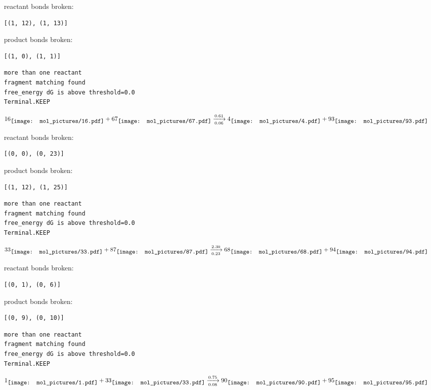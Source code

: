 \documentclass{article}
\begin{document}
reactant bonds broken:\begin{verbatim}
[(1, 12), (1, 13)]
\end{verbatim}
product bonds broken:\begin{verbatim}
[(1, 0), (1, 1)]
\end{verbatim}




\vspace{1cm}
\begin{verbatim}
more than one reactant
fragment matching found
free_energy dG is above threshold=0.0
Terminal.KEEP
\end{verbatim}
$$
16
\raisebox{-.5\height}{\texttt{[image: mol\_pictures/16.pdf]}}
+
67
\raisebox{-.5\height}{\texttt{[image: mol\_pictures/67.pdf]}}
\xrightarrow[0.06]{0.61}
4
\raisebox{-.5\height}{\texttt{[image: mol\_pictures/4.pdf]}}
+
93
\raisebox{-.5\height}{\texttt{[image: mol\_pictures/93.pdf]}}
$$


reactant bonds broken:\begin{verbatim}
[(0, 0), (0, 23)]
\end{verbatim}
product bonds broken:\begin{verbatim}
[(1, 12), (1, 25)]
\end{verbatim}




\vspace{1cm}
\begin{verbatim}
more than one reactant
fragment matching found
free_energy dG is above threshold=0.0
Terminal.KEEP
\end{verbatim}
$$
33
\raisebox{-.5\height}{\texttt{[image: mol\_pictures/33.pdf]}}
+
87
\raisebox{-.5\height}{\texttt{[image: mol\_pictures/87.pdf]}}
\xrightarrow[0.23]{2.30}
68
\raisebox{-.5\height}{\texttt{[image: mol\_pictures/68.pdf]}}
+
94
\raisebox{-.5\height}{\texttt{[image: mol\_pictures/94.pdf]}}
$$


reactant bonds broken:\begin{verbatim}
[(0, 1), (0, 6)]
\end{verbatim}
product bonds broken:\begin{verbatim}
[(0, 9), (0, 10)]
\end{verbatim}




\vspace{1cm}
\begin{verbatim}
more than one reactant
fragment matching found
free_energy dG is above threshold=0.0
Terminal.KEEP
\end{verbatim}
$$
1
\raisebox{-.5\height}{\texttt{[image: mol\_pictures/1.pdf]}}
+
33
\raisebox{-.5\height}{\texttt{[image: mol\_pictures/33.pdf]}}
\xrightarrow[0.08]{0.75}
90
\raisebox{-.5\height}{\texttt{[image: mol\_pictures/90.pdf]}}
+
95
\raisebox{-.5\height}{\texttt{[image: mol\_pictures/95.pdf]}}
$$
\end{document}
